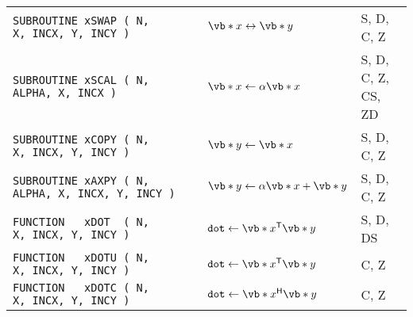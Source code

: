 \documentclass[10pt,a3paper, landscape]{article}
\newcommand{\T}{\mathsf{T}}
\renewcommand{\H}{\mathsf{H}}
\begin{document}
\begin{tabular}{lll}
		\verb|SUBROUTINE xSWAP ( N,         X, INCX, Y, INCY )                                         | & $\vb*{x} \leftrightarrow \vb*{y}$                                                                                                                                                                                                                            & S, D, C, Z         \\
		\verb|SUBROUTINE xSCAL ( N,  ALPHA, X, INCX )                                                  | & $\vb*{x} \gets \alpha \vb*{x}$                                                                                                                                                                                                                               & S, D, C, Z, CS, ZD \\
		\verb|SUBROUTINE xCOPY ( N,         X, INCX, Y, INCY )                                         | & $\vb*{y} \gets \vb*{x}$                                                                                                                                                                                                                                      & S, D, C, Z         \\
		\verb|SUBROUTINE xAXPY ( N,  ALPHA, X, INCX, Y, INCY )                                         | & $\vb*{y} \gets \alpha \vb*{x} + \vb*{y}$                                                                                                                                                                                                                     & S, D, C, Z         \\
		\verb|FUNCTION   xDOT  ( N,         X, INCX, Y, INCY )                                         | & $\texttt{dot} \gets \vb*{x}^{\T} \vb*{y}$                                                                                                                                                                                                                    & S, D, DS           \\
		\verb|FUNCTION   xDOTU ( N,         X, INCX, Y, INCY )                                         | & $\texttt{dot} \gets \vb*{x}^{\T} \vb*{y}$                                                                                                                                                                                                                    & C, Z               \\
		\verb|FUNCTION   xDOTC ( N,         X, INCX, Y, INCY )                                         | & $\texttt{dot} \gets \vb*{x}^{\H} \vb*{y}$                                                                                                                                                                                                                    & C, Z               \\

\end{tabular}
\end{document}
